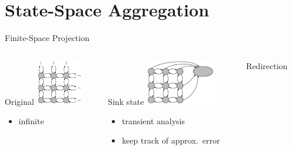 \documentclass[10pt]{beamer}
\begin{document}
\section{State-Space Aggregation}
\begin{frame}{Finite-Space Projection}
    \begin{columns}
        \begin{column}{.30\textwidth}
            \begin{block}{Original}
                \centering
                \vspace{3mm}
                \includegraphics[height=2cm]{../gfx/state_space_untrunc.pdf}
                {\small
                \begin{itemize}
                    \item infinite
                \end{itemize}
                }
            \end{block}
        \end{column}
        \begin{column}{.30\textwidth}
            \begin{block}{Sink state}
                \centering
                \vspace{3mm}
                \includegraphics[height=2cm]{../gfx/state_space_redirected.pdf}
                {\small
                \begin{itemize}
                    \item transient analysis
                    \item keep track of approx.\ error
                \end{itemize}
                }
            \end{block}
        \end{column}
        \begin{column}{.30\textwidth}
            \begin{block}{Redirection}
                \centering
                \vspace{3mm}

\end{block}
\end{column}
\end{columns}
\end{frame}
\end{document}
